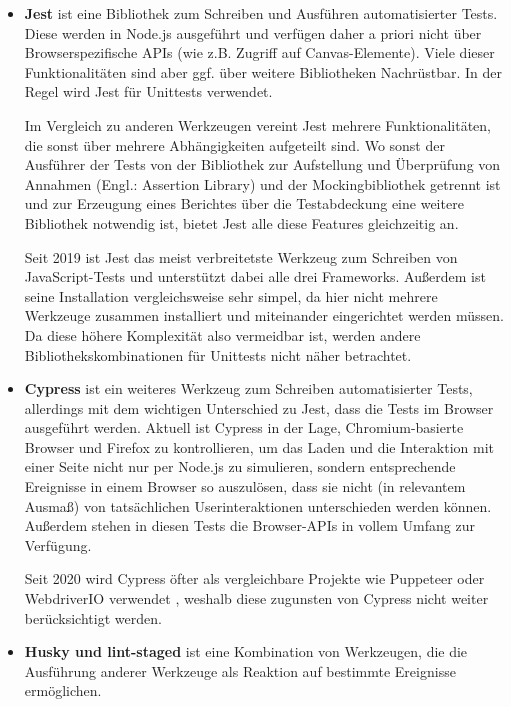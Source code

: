 \begin{itemize}
Zugunsten von SCSS / Sass wurde auf die weitere Überprüfung anderer Präprozessoren wie Less\footnote{\url{https://lesscss.org/}} verzichtet.

\item \textbf{Jest} ist eine Bibliothek zum Schreiben und Ausführen automatisierter Tests. Diese werden in Node.js ausgeführt und verfügen daher a priori nicht über Browserspezifische APIs (wie z.B. Zugriff auf Canvas-Elemente). Viele dieser Funktionalitäten sind aber ggf. über weitere Bibliotheken Nachrüstbar. In der Regel wird Jest für Unittests verwendet.

Im Vergleich zu anderen Werkzeugen vereint Jest mehrere Funktionalitäten, die sonst über mehrere Abhängigkeiten aufgeteilt sind. Wo sonst der Ausführer der Tests von der Bibliothek zur Aufstellung und Überprüfung von Annahmen (Engl.: \glqq Assertion Library\grqq) und der Mockingbibliothek getrennt ist und zur Erzeugung eines Berichtes über die Testabdeckung eine weitere Bibliothek notwendig ist, bietet Jest alle diese Features gleichzeitig an.

Seit 2019 ist Jest das meist verbreitetste Werkzeug zum Schreiben von JavaScript-Tests \cite{stateofjs} und unterstützt dabei alle drei Frameworks. Außerdem ist seine Installation vergleichsweise sehr simpel, da hier nicht mehrere Werkzeuge zusammen installiert und miteinander eingerichtet werden müssen. Da diese höhere Komplexität also vermeidbar ist, werden andere Bibliothekskombinationen für Unittests nicht näher betrachtet.

\item \textbf{Cypress} ist ein weiteres Werkzeug zum Schreiben automatisierter Tests, allerdings mit dem wichtigen Unterschied zu Jest, dass die Tests im Browser ausgeführt werden. Aktuell ist Cypress in der Lage, Chromium-basierte Browser und Firefox zu kontrollieren, um das Laden und die Interaktion mit einer Seite nicht nur per Node.js zu simulieren, sondern entsprechende Ereignisse in einem Browser so auszulösen, dass sie nicht (in relevantem Ausmaß) von tatsächlichen Userinteraktionen unterschieden werden können. Außerdem stehen in diesen Tests die Browser-APIs in vollem Umfang zur Verfügung.

Seit 2020 wird Cypress öfter als vergleichbare Projekte wie Puppeteer oder WebdriverIO verwendet \cite{stateofjs}, weshalb diese zugunsten von Cypress nicht weiter berücksichtigt werden.

\item \textbf{Husky und lint-staged} ist eine Kombination von Werkzeugen, die die Ausführung anderer Werkzeuge als Reaktion auf bestimmte Ereignisse ermöglichen.


\end{itemize}
